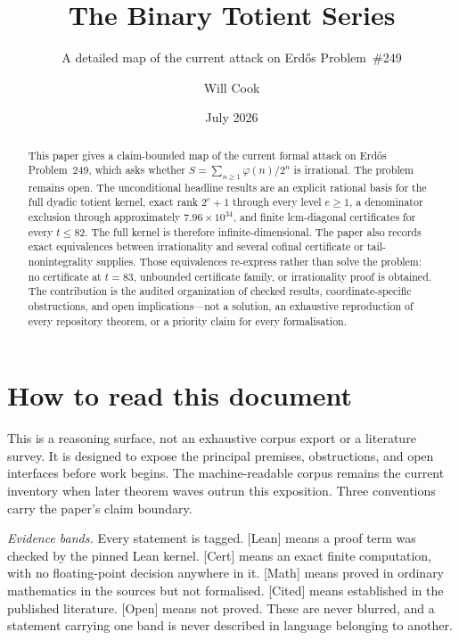 \documentclass[11pt]{article}
\title{The Binary Totient Series}
\subtitle{A detailed map of the current attack on Erd\H{o}s Problem~\#249}
\author{Will Cook}
\date{July 2026}
\theoremstyle{plain}
\theoremstyle{definition}
\theoremstyle{remark}
\newcommand{\ev}[1]{{\small\textsf{[#1]}}\xspace}
\newcommand{\ph}{\varphi}
\begin{document}
\maketitle

\paperprovenance

\begin{abstract}
This paper gives a claim-bounded map of the current formal attack on Erd\H{o}s
Problem~249, which asks whether
$S=\sum_{n\ge1}\ph(n)/2^n$ is irrational.  The problem remains open.
The unconditional headline results are an explicit rational basis for the
full dyadic totient kernel, exact rank $2^e+1$ through every level $e\ge1$, a denominator
exclusion through approximately $7.96\times10^{34}$, and finite
lcm-diagonal certificates for every $t\le82$.  The full kernel is therefore
infinite-dimensional.  The paper also records exact equivalences between
irrationality and several cofinal certificate or tail-nonintegrality supplies.
Those equivalences re-express rather than solve the problem: no certificate at
$t=83$, unbounded certificate family, or irrationality proof is obtained.  The
contribution is the audited organization of checked results,
coordinate-specific obstructions, and open implications---not a solution, an
exhaustive reproduction of every repository theorem, or a priority claim for
every formalisation.
\end{abstract}

\section*{How to read this document}

This is a reasoning surface, not an exhaustive corpus export or a literature
survey.  It is designed to expose the principal premises, obstructions, and
open interfaces before work begins.  The machine-readable corpus remains the
current inventory when later theorem waves outrun this exposition.  Three
conventions carry the paper's claim boundary.

\emph{Evidence bands.}  Every statement is tagged.  \ev{Lean} means a proof term
was checked by the pinned Lean kernel.  \ev{Cert} means an exact finite
computation, with no floating-point decision anywhere in it.  \ev{Math} means
proved in ordinary mathematics in the sources but not formalised.  \ev{Cited}
means established in the published literature.  \ev{Open} means not proved.
These are never blurred, and a statement carrying one band is never described in
language belonging to another.
\end{document}
